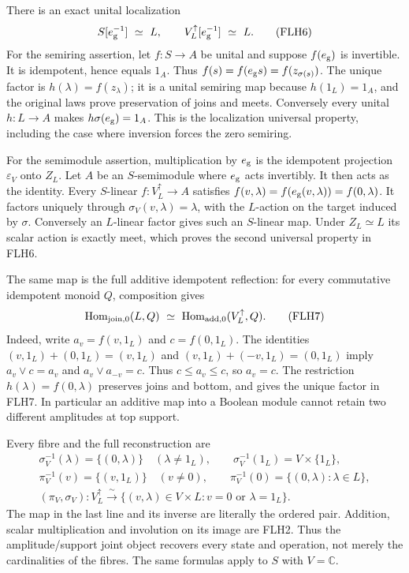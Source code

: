 There is an exact unital localization
\[
 S[e_{\rm g}^{-1}]\ \simeq\ L,\qquad
 V_L^\uparrow[e_{\rm g}^{-1}]\ \simeq\ L.
\tag{FLH6}
\]
For the semiring assertion, let \(f:S\to A\) be unital and
suppose \(f(e_{\rm g})\) is invertible. It is idempotent, hence
equals \(1_A\). Thus
\(f(s)=f(e_{\rm g}s)=f(z_{\sigma(s)})\).
The unique factor is \(h(\lambda)=f(z_\lambda)\); it is a
unital semiring map because \(h(1_L)=1_A\), and the original
laws prove preservation of joins and meets. Conversely every
unital \(h:L\to A\) makes \(h\sigma(e_{\rm g})=1_A\).
This is the localization universal property, including the
case where inversion forces the zero semiring.

For the semimodule assertion, multiplication by \(e_{\rm g}\)
is the idempotent projection \(\varepsilon_V\) onto \(Z_L\).
Let \(A\) be an \(S\)-semimodule where \(e_{\rm g}\) acts
invertibly. It then acts as the identity. Every \(S\)-linear
\(f:V_L^\uparrow\to A\) satisfies
\(f(v,\lambda)=f(e_{\rm g}(v,\lambda))=f(0,\lambda)\).
It factors uniquely through
\(\sigma_V(v,\lambda)=\lambda\), with the \(L\)-action on
the target induced by \(\sigma\).
Conversely an \(L\)-linear factor gives such an \(S\)-linear
map. Under \(Z_L\simeq L\) its scalar action is exactly meet,
which proves the second universal property in FLH6.

The same map is the full additive idempotent reflection:
for every commutative idempotent monoid \(Q\), composition gives
\[
\operatorname{Hom}_{\rm join,0}(L,Q)
\ \simeq\
\operatorname{Hom}_{\rm add,0}(V_L^\uparrow,Q).
\tag{FLH7}
\]
Indeed, write \(a_v=f(v,1_L)\) and \(c=f(0,1_L)\).
The identities
\((v,1_L)+(0,1_L)=(v,1_L)\) and
\((v,1_L)+(-v,1_L)=(0,1_L)\) imply
\(a_v\vee c=a_v\) and \(a_v\vee a_{-v}=c\).
Thus \(c\le a_v\le c\), so \(a_v=c\).
The restriction \(h(\lambda)=f(0,\lambda)\) preserves joins
and bottom, and gives the unique factor in FLH7.
In particular an additive map into a Boolean module cannot
retain two different amplitudes at top support.

Every fibre and the full reconstruction are
\[
\begin{gathered}
\sigma_V^{-1}(\lambda)=\{(0,\lambda)\}\quad(\lambda\ne1_L),
\qquad
\sigma_V^{-1}(1_L)=V\times\{1_L\},\\
\pi_V^{-1}(v)=\{(v,1_L)\}\quad(v\ne0),\qquad
\pi_V^{-1}(0)=\{(0,\lambda):\lambda\in L\},\\
(\pi_V,\sigma_V):
 V_L^\uparrow\xrightarrow{\ \sim\ }
 \{(v,\lambda)\in V\times L:v=0\text{ or }\lambda=1_L\}.
\end{gathered}\tag{FLH8}
\]
The map in the last line and its inverse are literally the
ordered pair. Addition, scalar multiplication and involution
on its image are FLH2. Thus the amplitude/support joint object
recovers every state and operation, not merely the cardinalities
of the fibres. The same formulas apply to \(S\) with \(V=\mathbb C\).

